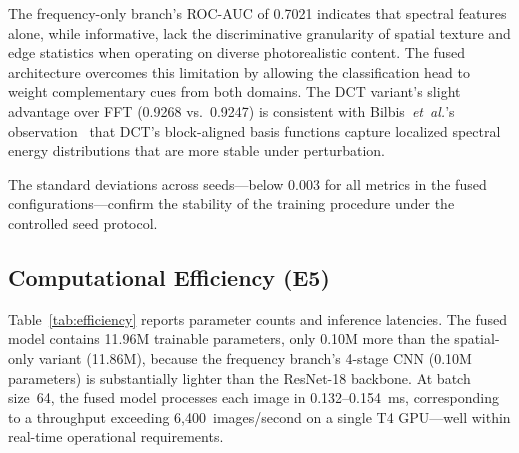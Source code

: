 \documentclass[conference]{IEEEtran}
\begin{document}
\begin{table}[t]
\caption{In-Domain Ablation on GRAVEX Test Set (mean $\pm$ std over seeds)}
\label{tab:ablation}
\centering
{}
\end{table}

The frequency-only branch's ROC-AUC of 0.7021 indicates that spectral features alone, while informative, lack the discriminative granularity of spatial texture and edge statistics when operating on diverse photorealistic content. The fused architecture overcomes this limitation by allowing the classification head to weight complementary cues from both domains. The DCT variant's slight advantage over FFT (0.9268 vs.\ 0.9247) is consistent with Bilbis~\emph{et~al.}'s observation~\cite{bilbis2025dctvsfft} that DCT's block-aligned basis functions capture localized spectral energy distributions that are more stable under perturbation.

The standard deviations across seeds---below 0.003 for all metrics in the fused configurations---confirm the stability of the training procedure under the controlled seed protocol.

\subsection{Computational Efficiency (E5)}

Table~\ref{tab:efficiency} reports parameter counts and inference latencies. The fused model contains 11.96M trainable parameters, only 0.10M more than the spatial-only variant (11.86M), because the frequency branch's 4-stage CNN (0.10M parameters) is substantially lighter than the ResNet-18 backbone. At batch size~64, the fused model processes each image in 0.132--0.154~ms, corresponding to a throughput exceeding 6{,}400~images/second on a single T4 GPU---well within real-time operational requirements.
\end{document}
